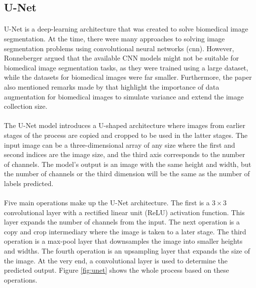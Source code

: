 \documentclass[12pt,oneside]{report}
\begin{document}
\subsection{U-Net}
\paragraph{}
U-Net is a deep-learning architecture that was created to solve biomedical image segmentation. At the time, there were many approaches to solving image segmentation problems using convolutional neural networks (\acrshort{cnn}). However, Ronneberger \etal \cite{ronneberger_u-net_2015} argued that the available CNN models might not be suitable for biomedical image segmentation tasks, as they were trained using a large dataset, while the datasets for biomedical images were far smaller. Furthermore, the paper \cite{ronneberger_u-net_2015} also mentioned remarks made by \cite{dosovitskiy_discriminative_2015} that highlight the importance of data augmentation for biomedical images to simulate variance and extend the image collection size.

\paragraph{}
The U-Net model introduces a U-shaped architecture where images from earlier stages of the process are copied and cropped to be used in the latter stages. The input image can be a three-dimensional array of any size where the first and second indices are the image size, and the third axis corresponds to the number of channels. The model's output is an image with the same height and width, but the number of channels or the third dimension will be the same as the number of labels predicted.

\paragraph{}
Five main operations make up the U-Net architecture. The first is a $3 \times 3$ convolutional layer with a rectified linear unit (ReLU) activation function. This layer expands the number of channels from the input. The next operation is a copy and crop intermediary where the image is taken to a later stage. The third operation is a max-pool layer that downsamples the image into smaller heights and widths. The fourth operation is an upsampling layer that expands the size of the image. At the very end, a convolutional layer is used to determine the predicted output. Figure \ref{fig:unet} shows the whole process based on these operations.
\end{document}
